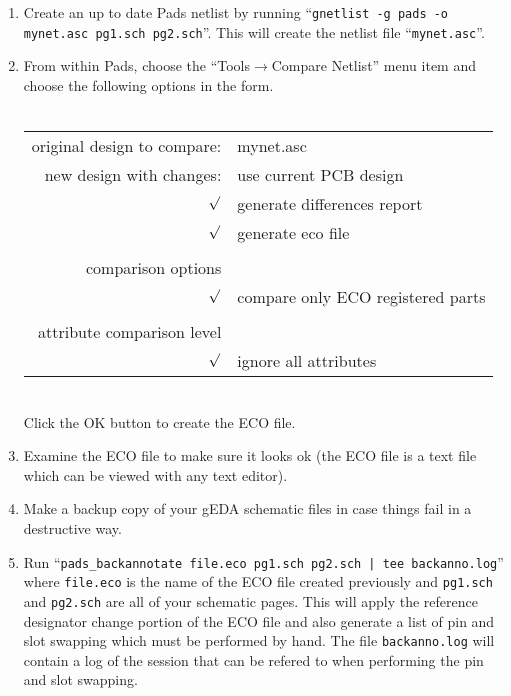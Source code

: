 \documentclass{article}
\begin{document}
\begin{enumerate}
\item Create an up to date Pads netlist by running ``{\tt gnetlist -g pads
    -o mynet.asc pg1.sch pg2.sch}''.  This will create the netlist
  file ``{\tt mynet.asc}''.

\item From within Pads, choose the ``Tools$\rightarrow$Compare
  Netlist'' menu item and choose the following options in the form.\\
  \\
  \begin{tabular}{|r l|}
    \hline 
    original design to compare:& mynet.asc \\
    new design with changes:& use current PCB design \\
     $\surd$&generate differences report \\
     $\surd$&generate eco file\\
     &\\
     comparison options &\\
     $\surd$&compare only ECO registered parts\\
     &\\
     attribute comparison level &\\
     $\surd$&ignore all attributes\\
    \hline 
  \end{tabular}
  \\
  Click the OK button to create the ECO file.

\item Examine the ECO file to make sure it looks ok (the ECO file is a
  text file which can be viewed with any text editor).

\item Make a backup copy of your gEDA schematic files in case things fail
  in a destructive way.

\item Run ``{\tt pads\_backannotate file.eco pg1.sch pg2.sch | tee
    backanno.log}'' where 
  {\tt file.eco} is the name of the ECO file created previously and
  {\tt pg1.sch} and {\tt pg2.sch} are all of your schematic pages.
  This will apply the reference designator change portion of the ECO
  file and also generate a list of pin and slot swapping which must be
  performed by hand.  The file {\tt backanno.log} will contain a log
  of the session that can be refered to when performing the pin and
  slot swapping.
\end{enumerate}
\end{document}
